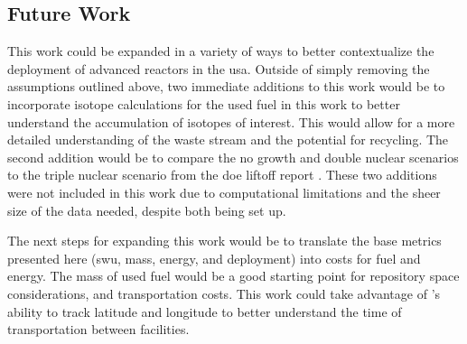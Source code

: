 



\subsection{Future Work}
\label{sec:future_work}

This work could be expanded in a variety of ways to better contextualize the deployment of advanced reactors in the \gls{usa}. Outside of simply removing the assumptions outlined above, two immediate additions to this work would be to incorporate isotope calculations for the used fuel in this work to better understand the accumulation of isotopes of interest. This would allow for a more detailed understanding of the waste stream and the potential for recycling. The second addition would be to compare the no growth and double nuclear scenarios to the triple nuclear scenario from the \gls{doe} liftoff report \cite{julie_liftoff_pathways_2024}. These two additions were not included in this work due to computational limitations and the sheer size of the data needed, despite both being set up.

The next steps for expanding this work would be to translate the base metrics presented here (\gls{swu}, mass, energy, and deployment) into costs for fuel and energy. The mass of used fuel would be a good starting point for repository space considerations, and transportation costs. This work could take advantage of \cyclus's ability to track latitude and longitude to better understand the time of transportation between facilities.

